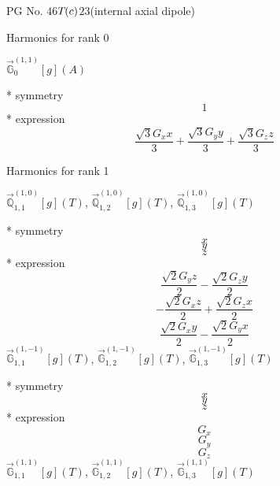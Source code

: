 \documentclass[fleqn,8pt]{jsarticle}
\begin{document}
\setcounter{MaxMatrixCols}{32}

\renewcommand{\tablename}{Table~}
\renewcommand{\figurename}{Figure~}
\begin{center}
\LARGE
PG No. 46\quad$T_{\rm }(c)$\quad$23$\quad[ cubic ] (internal axial dipole)
\end{center}

\noindent * Harmonics for rank 0

\noindent\quad $\vec{\mathbb{G}}_{0}^{(1,1)}[g](A)$

\noindent\quad ** symmetry
\begin{dmath*}
1
\end{dmath*}
\noindent\quad ** expression
\begin{dmath*}
\frac{\sqrt{3} G_{x} x}{3} + \frac{\sqrt{3} G_{y} y}{3} + \frac{\sqrt{3} G_{z} z}{3}
\end{dmath*}

\noindent * Harmonics for rank 1

\noindent\quad $\vec{\mathbb{Q}}_{1,1}^{(1,0)}[g](T)$, $\vec{\mathbb{Q}}_{1,2}^{(1,0)}[g](T)$, $\vec{\mathbb{Q}}_{1,3}^{(1,0)}[g](T)$

\noindent\quad ** symmetry
\begin{dmath*}
x
\end{dmath*}
\begin{dmath*}
y
\end{dmath*}
\begin{dmath*}
z
\end{dmath*}
\noindent\quad ** expression
\begin{dmath*}
\frac{\sqrt{2} G_{y} z}{2} - \frac{\sqrt{2} G_{z} y}{2}
\end{dmath*}
\begin{dmath*}
- \frac{\sqrt{2} G_{x} z}{2} + \frac{\sqrt{2} G_{z} x}{2}
\end{dmath*}
\begin{dmath*}
\frac{\sqrt{2} G_{x} y}{2} - \frac{\sqrt{2} G_{y} x}{2}
\end{dmath*}
\noindent\quad $\vec{\mathbb{G}}_{1,1}^{(1,-1)}[g](T)$, $\vec{\mathbb{G}}_{1,2}^{(1,-1)}[g](T)$, $\vec{\mathbb{G}}_{1,3}^{(1,-1)}[g](T)$

\noindent\quad ** symmetry
\begin{dmath*}
x
\end{dmath*}
\begin{dmath*}
y
\end{dmath*}
\begin{dmath*}
z
\end{dmath*}
\noindent\quad ** expression
\begin{dmath*}
G_{x}
\end{dmath*}
\begin{dmath*}
G_{y}
\end{dmath*}
\begin{dmath*}
G_{z}
\end{dmath*}
\noindent\quad $\vec{\mathbb{G}}_{1,1}^{(1,1)}[g](T)$, $\vec{\mathbb{G}}_{1,2}^{(1,1)}[g](T)$, $\vec{\mathbb{G}}_{1,3}^{(1,1)}[g](T)$
\end{document}
